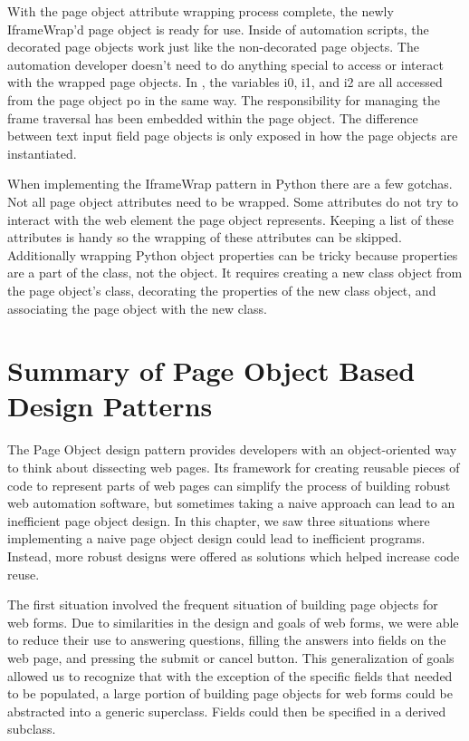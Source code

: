 With the page object attribute wrapping process complete, the newly
IframeWrap'd page object is ready for use. Inside of automation scripts, the
decorated page objects work just like the non-decorated page objects. The
automation developer doesn't need to do anything special to access or interact
with the wrapped page objects. In , the variables
i0, i1, and i2 are all accessed from the page object po in the same way.  The
responsibility for managing the frame traversal has been embedded within the
page object. The difference between text input field page objects is only
exposed in how the page objects are instantiated.

When implementing the IframeWrap pattern in Python there are a few gotchas. Not
all page object attributes need to be wrapped. Some attributes do not try to
interact with the web element the page object represents. Keeping a list of
these attributes is handy so the wrapping of these attributes can be skipped.
Additionally wrapping Python object properties can be tricky because properties
are a part of the class, not the object. It requires creating a new class
object from the page object's class, decorating the properties of the new class
object, and associating the page object with the new class.



\section{Summary of Page Object Based Design Patterns}
\label{sec:summary_page_object_design_pattern}

The Page Object design pattern provides developers with an object-oriented way
to think about dissecting web pages. Its framework for creating reusable pieces
of code to represent parts of web pages can simplify the process of building
robust web automation software, but sometimes taking a naive approach can lead
to an inefficient page object design. In this chapter, we saw three situations
where implementing a naive page object design could lead to inefficient
programs. Instead, more robust designs were offered as solutions which helped
increase code reuse.

The first situation involved the frequent situation of building page objects
for web forms.  Due to similarities in the design and goals of web forms, we were
able to reduce their use to answering questions, filling the answers into fields
on the web page, and pressing the submit or cancel button. This generalization of
goals allowed us to recognize that with the exception of the specific fields
that needed to be populated, a large portion of building page objects for web
forms could be abstracted into a generic  superclass. Fields
could then be specified in a derived subclass.


